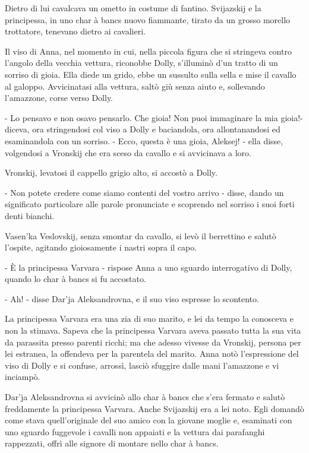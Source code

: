 Dietro di lui cavalcava un ometto in costume di fantino. Svijazskij e la principessa, in uno char à bancs nuovo fiammante, tirato da un grosso morello trottatore, tenevano dietro ai cavalieri. 

Il viso di Anna, nel momento in cui, nella piccola figura che si stringeva contro l'angolo della vecchia vettura, riconobbe Dolly, s'illuminò d'un tratto di un sorriso di gioia. Ella diede un grido, ebbe un sussulto sulla sella e mise il cavallo al galoppo. Avvicinatasi alla vettura, saltò giù senza aiuto e, sollevando l'amazzone, corse verso Dolly. 

- Lo pensavo e non osavo pensarlo. Che gioia! Non puoi immaginare la mia gioia!- diceva, ora stringendosi col viso a Dolly e baciandola, ora allontanandosi ed esaminandola con un sorriso. - Ecco, questa è una gioia, Aleksej! - ella disse, volgendosi a Vronskij che era sceso da cavallo e si avvicinava a loro. 

Vronskij, levatosi il cappello grigio alto, si accostò a Dolly. 

- Non potete credere come siamo contenti del vostro arrivo - disse, dando un significato particolare alle parole pronunciate e scoprendo nel sorriso i suoi forti denti bianchi. 

Vasen'ka Veslovskij, senza smontar da cavallo, si levò il berrettino e salutò l'ospite, agitando gioiosamente i nastri sopra il capo. 

- È la principessa Varvara - rispose Anna a uno sguardo interrogativo di Dolly, quando lo char à bancs si fu accostato. 

- Ah! - disse Dar'ja Aleksandrovna, e il suo viso espresse lo scontento. 

La principessa Varvara era una zia di suo marito, e lei da tempo la conosceva e non la stimava. Sapeva che la principessa Varvara aveva passato tutta la sua vita da parassita presso parenti ricchi; ma che adesso vivesse da Vronskij, persona per lei estranea, la offendeva per la parentela del marito. Anna notò l'espressione del viso di Dolly e si confuse, arrossì, lasciò sfuggire dalle mani l'amazzone e vi inciampò. 

Dar'ja Aleksandrovna si avvicinò allo char à bancs che s'era fermato e salutò freddamente la principessa Varvara. Anche Svijazskij era a lei noto. Egli domandò come stava quell'originale del suo amico con la giovane moglie e, esaminati con uno sguardo fuggevole i cavalli non appaiati e la vettura dai parafanghi rappezzati, offrì alle signore di montare nello char à bancs. 

